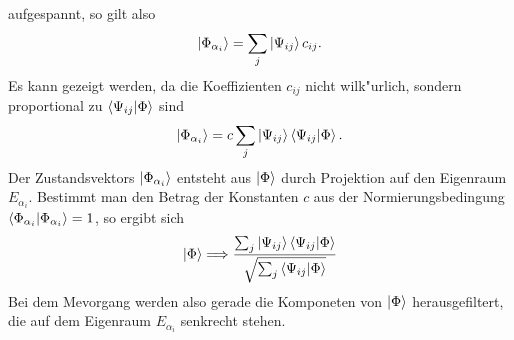          aufgespannt, so gilt also
         $$ \left| \Phi_{\alpha_i} \right> = \sum_j \left| \Psi_{ij} \right> c_{ij}. $$
         Es kann gezeigt werden, da\3  die Koeffizienten $c_{ij}$ nicht wilk"urlich, sondern proportional zu $\left< \Psi_{ij} | \Phi \right>$ sind
         $$ \left| \Phi_{\alpha_i} \right> = c \sum_j \left| \Psi_{ij} \right>\left< \Psi_{ij} | \Phi \right>.$$
         Der Zustandsvektors $\left| \Phi_{\alpha_i} \right>$ entsteht aus $\left| \Phi \right>$ durch Projektion auf den Eigenraum $E_{\alpha_i}$. Bestimmt man den Betrag der 
         Konstanten $c$ aus der Normierungsbedingung $\left< \Phi_{\alpha_i} | \Phi_{\alpha_i} \right> = 1$, so ergibt sich
         $$ \left| \Phi \right> \Longrightarrow \frac{\sum_j \left| \Psi_{ij} \right> \left< \Psi_{ij} | \Phi \right>} {\sqrt{\sum_j\left< \Psi_{ij} | \Phi \right>}} $$
         Bei dem Me\3vorgang werden also gerade die Komponeten von $\left| \Phi \right>$ herausgefiltert, die auf dem Eigenraum $E_{\alpha_i}$ senkrecht stehen.
